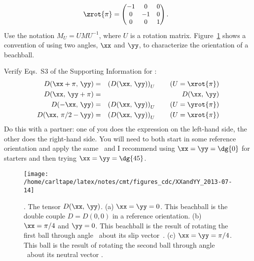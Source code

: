 \documentclass[11pt,titlepage,fleqn]{article}
\begin{document}
\begin{enumerate}
\begin{equation*}
\zrot{\pi}=\begin{small}\begin{pmatrix}   -1 & 0 & 0 \\
                                          0 & -1 & 0 \\
                                          0  & 0 & 1\end{pmatrix}\end{small}.\:\:\:
\label{eq:DefXxiYxiZxi}
\end{equation*}
%
Use the notation $M_U=UMU^{-1}$, where $U$ is a rotation matrix. Figure~\ref{fig:XXandYY} shows a convention of using two angles, $\xx$ and $\yy$, to characterize the orientation of a beachball.

Verify Eqs.~S3 of the Supporting Information for \citet{TapeTape2013}:
%
\begin{eqnarray}
D(\xx+\pi,\,\yy)&=&\left(D(\xx,\,\yy)\right)_U\hspace{20pt}(U=\xrot{\pi})
\label{eq1}
\\
D(\xx,\,\yy+\pi)&=&D(\xx,\,\yy)
\label{eq2}
\\
D(-\xx,\,\yy)&=&\left(D(\xx,\,\yy)\right)_U\hspace{20pt}(U=\yrot{\pi})
\label{eq3}
\\
D(\xx,\,\pi/2-\yy)&=&\left(D(\xx,\,\yy)\right)_U\hspace{20pt}(U=\xrot{\pi})
\label{eq4}
\end{eqnarray}
%
Do this with a partner: one of you does the expression on the left-hand side, the other does the right-hand side. You will need to both start in some reference orientation and apply the same \xx\ and \yy\; I recommend using $\xx=\yy=\dg{0}$ for starters and then trying $\xx=\yy=\dg{45}$.

\end{enumerate}


\begin{figure}[h]
\center
\texttt{[image: /home/carltape/latex/notes/cmt/figures\_cdc/XXandYY\_2013-07-14]}
\caption{
\citep[Figure~8 of][]{TapeTape2013}. The tensor $D(\xx,\,\yy)$.
(a) $\xx=\yy=0$. This beachball is the double couple $D=D(0,0)$ in a reference orientation.
(b) $\xx=\pi/4$ and $\yy=0$. This beachball is the result of rotating the first ball through angle \xx\ about its slip vector~\mbS.
(c) $\xx=\yy=\pi/4$. This ball is the result of rotating the second ball through angle \yy\ about its neutral vector \mbB.
\label{fig:XXandYY}
}
\end{figure}




\end{document}
